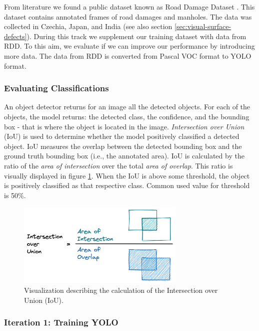 From literature we found a public dataset known as Road Damage Dataset \cite{Arya2020-competition}. This dataset contains annotated frames of road damages and manholes. The data was collected in Czechia, Japan, and India (see also section \ref{sec:visual-surface-defects}). During this track we supplement our training dataset with data from RDD. To this aim, we evaluate if we can improve our performance by introducing more data. The data from RDD is converted from Pascal VOC \cite{PascalVOC} format to YOLO format.


\subsubsection{Evaluating Classifications}

An object detector returns for an image all the detected objects. For each of the objects, the model returns: the detected class, the confidence, and the bounding box - that is where the object is located in the image. \textit{Intersection over Union} (IoU) is used to determine whether the model positively classified a detected object. IoU measures the overlap between the detected bounding box and the ground truth bounding box (i.e., the annotated area). IoU is calculated by the ratio of the \textit{area of intersection} over the total \textit{area of overlap}. This ratio is visually displayed in figure \ref{fig:iou}. When the IoU is above some threshold, the object is positively classified as that respective class. Common used value for threshold is 50\%.


\begin{figure}[ht]
\begin{center}
\includegraphics[height=4cm]{images/5_multimodal_fusion/IoU.png}
\end{center}
\captionsetup{width=0.95\textwidth}
\caption{Visualization describing the calculation of the Intersection over Union (IoU).}
\label{fig:iou}
\end{figure}


\subsubsection{Iteration 1: Training YOLO}

